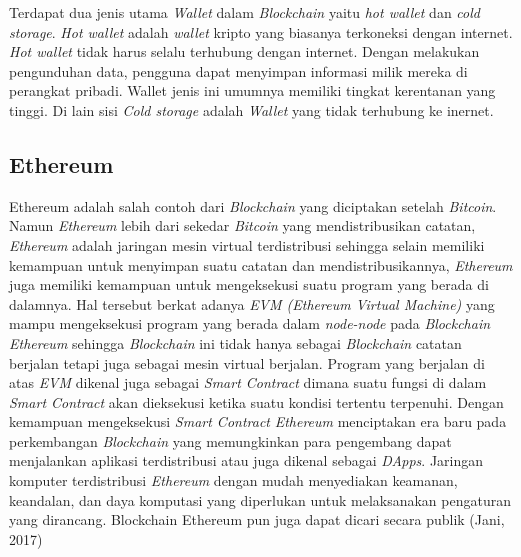 Terdapat dua jenis utama \emph{Wallet} dalam \emph{Blockchain} yaitu \emph{hot wallet} dan \emph{cold storage}. \emph{Hot wallet} adalah \emph{wallet} kripto yang biasanya terkoneksi dengan internet. \emph{Hot wallet} tidak harus selalu terhubung dengan internet. Dengan melakukan pengunduhan data, pengguna dapat menyimpan informasi milik mereka di perangkat pribadi. Wallet jenis ini umumnya memiliki tingkat kerentanan yang tinggi. Di lain sisi \emph{Cold storage} adalah \emph{Wallet} yang tidak terhubung ke inernet.

\subsection{Ethereum}

Ethereum adalah salah contoh dari \emph{Blockchain} yang diciptakan setelah \emph{Bitcoin}. Namun \emph{Ethereum} lebih dari sekedar \emph{Bitcoin} yang mendistribusikan catatan, \emph{Ethereum} adalah jaringan mesin virtual terdistribusi sehingga selain memiliki kemampuan untuk menyimpan suatu catatan dan mendistribusikannya, \emph{Ethereum} juga memiliki kemampuan untuk mengeksekusi suatu program yang berada di dalamnya. Hal tersebut berkat adanya \emph{EVM (Ethereum Virtual Machine)} yang mampu mengeksekusi program yang berada dalam \emph{node-node} pada \emph{Blockchain} \emph{Ethereum} sehingga \emph{Blockchain} ini tidak hanya sebagai \emph{Blockchain} catatan berjalan tetapi juga sebagai mesin virtual berjalan. Program yang berjalan di atas \emph{EVM} dikenal juga sebagai \emph{Smart Contract} dimana suatu fungsi di dalam \emph{Smart Contract} akan dieksekusi ketika suatu kondisi tertentu terpenuhi. Dengan kemampuan mengeksekusi \emph{Smart Contract} \emph{Ethereum} menciptakan era baru pada perkembangan \emph{Blockchain} yang memungkinkan para pengembang dapat menjalankan aplikasi terdistribusi atau juga dikenal sebagai \emph{DApps}.  Jaringan komputer terdistribusi \emph{Ethereum} dengan mudah menyediakan keamanan, keandalan, dan daya komputasi yang
diperlukan untuk melaksanakan pengaturan yang dirancang. Blockchain Ethereum pun
juga dapat dicari secara publik (Jani, 2017)

